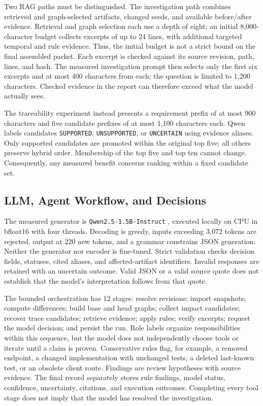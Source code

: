\documentclass[conference,letterpaper,10pt]{IEEEtran}
\begin{document}
Two RAG paths must be distinguished. The investigation path combines retrieved and graph-selected artifacts, changed seeds, and available before/after evidence. Retrieval and graph selection each use a depth of eight; an initial 8,000-character budget collects excerpts of up to 24 lines, with additional targeted temporal and rule evidence. Thus, the initial budget is not a strict bound on the final assembled packet. Each excerpt is checked against its source revision, path, lines, and hash. The measured investigation prompt then selects only the first six excerpts and at most 400 characters from each; the question is limited to 1,200 characters. Checked evidence in the report can therefore exceed what the model actually sees.

The traceability experiment instead presents a requirement prefix of at most 900 characters and five candidate prefixes of at most 1,100 characters each. Qwen labels candidates \texttt{SUPPORTED}, \texttt{UNSUPPORTED}, or \texttt{UNCERTAIN} using evidence aliases. Only supported candidates are promoted within the original top five; all others preserve hybrid order. Membership of the top five and top ten cannot change. Consequently, any measured benefit concerns ranking within a fixed candidate set.

\subsection{LLM, Agent Workflow, and Decisions}
The measured generator is \texttt{Qwen2.5-1.5B-Instruct} \cite{qwen}, executed locally on CPU in bfloat16 with four threads. Decoding is greedy, inputs exceeding 3,072 tokens are rejected, output at 220 new tokens, and a grammar constrains JSON generation. Neither the generator nor encoder is fine-tuned. Strict validation checks decision fields, statuses, cited aliases, and affected-artifact identifiers. Invalid responses are retained with an uncertain outcome. Valid JSON or a valid source quote does not establish that the model's interpretation follows from that quote.

The bounded orchestration has 12 stages: resolve revisions; import snapshots; compute differences; build base and head graphs; collect impact candidates; recover trace candidates; retrieve evidence; apply rules; verify excerpts; request the model decision; and persist the run. Role labels organize responsibilities within this sequence, but the model does not independently choose tools or iterate until a claim is proven. Conservative rules flag, for example, a removed endpoint, a changed implementation with unchanged tests, a deleted last-known test, or an obsolete client route. Findings are review hypotheses with source evidence. The final record separately stores rule findings, model status, confidence, uncertainty, citations, and execution outcomes. Completing every tool stage does not imply that the model has resolved the investigation.
\end{document}
